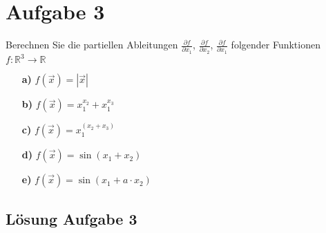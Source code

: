 \documentclass[ngerman, a4paper]{scrartcl}
\begin{document}
	
	\section*{Aufgabe 3}
	Berechnen Sie die partiellen Ableitungen $\frac{\partial f}{\partial x_1}$, $\frac{\partial f}{\partial x_2}$, $\frac{\partial f}{\partial x_1}$ folgender Funktionen $f: \mathbb{R}^3\rightarrow\mathbb{R}$
		
	\begin{itemize}
		\item[\textbf{a)}] $ f(\vec{x}) = |\vec{x}| $
		\item[\textbf{b)}] $ f(\vec{x}) = x_1^{x_2} + x_1^{x_3} $
		\item[\textbf{c)}] $ f(\vec{x}) = x_1^{(x_2 + x_3)} $
		\item[\textbf{d)}] $ f(\vec{x}) = \sin(x_1 + x_2) $
		\item[\textbf{e)}] $ f(\vec{x}) = \sin(x_1 + a\cdot x_2) $
	\end{itemize}
	
	\subsection*{Lösung Aufgabe 3}
	
\end{document}
